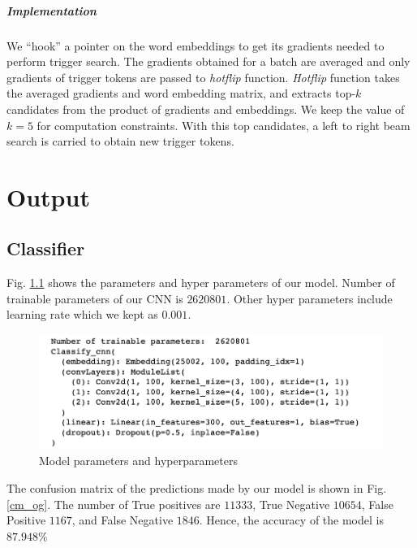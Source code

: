 \documentclass[12pt]{report}
\begin{document}
\begin{spacing}{1.5}
\paragraph{Implementation}
We ``hook'' a pointer on the word embeddings to get its gradients needed to perform trigger search. The gradients obtained for a batch are averaged and only gradients of trigger tokens are passed to \textit{hotflip} function.
\textit{Hotflip} function takes the averaged gradients and word embedding matrix, and extracts top-$k$ candidates from the product of gradients and embeddings. We keep the value of $k = 5$ for computation constraints. With this top candidates, a left to right beam search is carried to obtain new trigger tokens.

\chapter{Output}
\section{Classifier}
Fig. \ref{model_param} shows the parameters and hyper parameters of our model. Number of trainable parameters of our CNN is $2620801$. Other hyper parameters include learning rate which we kept as $0.001$.

\begin{figure}[!h]
  \centering
  \includegraphics[width=0.6\linewidth]{./img/output/model_param.png}
  \caption{Model parameters and hyperparameters}
  \label{model_param}
\end{figure}

The confusion matrix of the predictions made by our model is shown in Fig. \ref{cm_og}. The number of True positives are $11333$, True Negative $10654$, False Positive $1167$, and False Negative $1846$. Hence, the accuracy of the model is $87.948\%$


\end{spacing}
\end{document}
